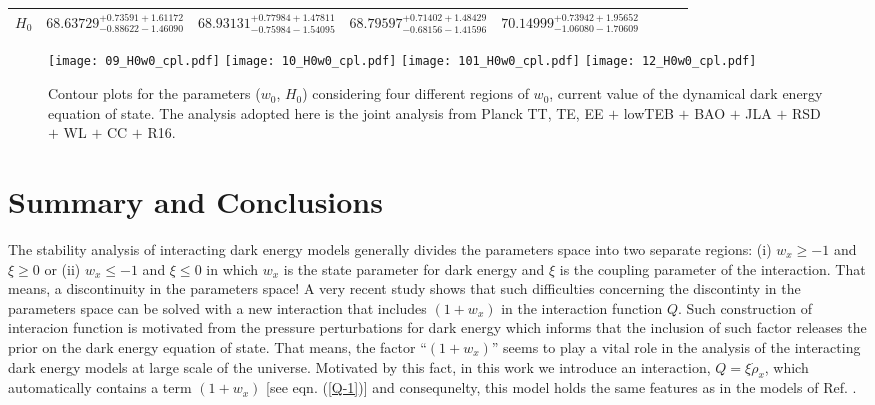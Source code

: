 \documentclass[superscriptaddress,oneolumn,secnumarabic,
amssymb,amsmath,nobibnotes,aps,prd,showpacs,nofootinbib]{revtex4}%
\begin{document}
\begin{itemize}
\begin{table}
\begin{tabular}{cccccccc}
$H_0$ & $   68.63729_{-    0.88622-    1.46090}^{+    0.73591+    1.61172}$ & $   68.93131_{-    0.75984-    1.54095}^{+    0.77984+    1.47811}$ & $68.79597_{-    0.68156-    1.41596}^{+    0.71402+    1.48429}$ &$   70.14999_{-    1.06080-    1.70609}^{+    0.73942+    1.95652}$\\
\hline
\end{tabular}%
\label{tab:tension2}
\end{table}

	\begin{figure}[tbh]
		\texttt{[image: 09\_H0w0\_cpl.pdf]}
		\texttt{[image: 10\_H0w0\_cpl.pdf]}
		\texttt{[image: 101\_H0w0\_cpl.pdf]}
		\texttt{[image: 12\_H0w0\_cpl.pdf]}
		\caption{Contour plots for the parameters ($w_0$, $H_0$) considering four different regions of $w_0$, current value of the dynamical dark energy equation of state. The analysis adopted here is the joint analysis from Planck TT, TE, EE $+$ lowTEB $+$ BAO $+$ JLA $+$ RSD $+$ WL $+$ CC $+$ R16.}
		\label{fig:tension2}
	\end{figure}


\end{itemize}




\section{Summary and Conclusions}
\label{conclu}

The stability analysis of interacting dark energy models generally divides the parameters space into two separate regions: (i) $w_x \geq -1$ and $\xi \geq 0$ or (ii) $w_x \leq -1$ and $\xi \leq 0$ in which $w_x$ is the state parameter for dark energy and $\xi$ is the coupling parameter of the interaction. That means, a discontinuity in the parameters space! A very recent study \cite{ypb} shows  that such difficulties concerning the discontinty in the parameters space can be solved with a new interaction that includes $(1+w_x)$ in the interaction function $Q$. Such construction of interacion function is motivated from the pressure perturbations for dark energy which informs that the inclusion of such factor releases the prior on the dark energy equation of state. That means, the factor ``$(1+w_x)$'' seems to play a vital role in the analysis of the interacting dark energy models at large scale of the universe. Motivated by this fact, in this work we introduce an interaction,
$Q = \xi \dot{\rho}_x$, which automatically contains a term $(1+w_x)$ [see eqn. (\ref{Q-1})] and consequnelty, this model holds the same features as in the  models of Ref. \cite{ypb}.
\end{document}
